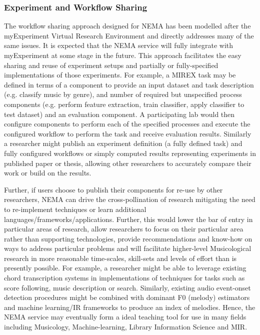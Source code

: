 \documentclass[conference]{IEEEtran}
\begin{document}
\subsubsection{Experiment and Workflow Sharing}
The workflow sharing approach designed for NEMA has been modelled after the myExperiment Virtual Research Environment \cite{de2007designing} and directly addresses many of the same issues. It is expected that the NEMA service will fully integrate with myExperiment at some stage in the future.  This approach facilitates the easy sharing and reuse of experiment setups and partially or fully-specified implementations of those experiments. For example, a MIREX task may be defined in terms of a component to provide an input dataset and task description (e.g. classify music by genre), and number of required but unspecified process components (e.g. perform feature extraction, train classifier, apply classifier to test dataset) and an evaluation component. A participating lab would then configure components to perform each of the specified processes and execute the configured workflow to perform the task and receive evaluation results.  Similarly a researcher might publish an experiment definition (a fully defined task) and fully configured workflows or simply computed results representing experiments in published paper or thesis, allowing other researchers to accurately compare their work or build on the results.

Further, if users choose to publish their components for re-use by other researchers, NEMA can drive the cross-pollination of research mitigating the need to re-implement techniques or learn additional languages/frameworks/applications. Further, this would lower the bar of entry in particular areas of research, allow researchers to focus on their particular area rather than supporting technologies, provide recommendations and know-how on ways to address particular problems and will facilitate higher-level Musicological research in more reasonable time-scales, skill-sets and levels of effort than is presently possible.   
For example, a researcher might be able to leverage existing chord transcription systems in implementations of techniques for tasks such as score following, music description or search. Similarly, existing audio event-onset detection procedures might be combined with dominant F0 (melody) estimators and machine learning/IR frameworks to produce an index of melodies. 
Hence, the NEMA service may eventually form a ideal teaching tool for use in many fields including Musicology, Machine-learning, Library Information Science and MIR.
\end{document}
